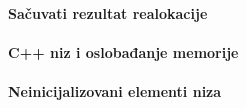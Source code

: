 \paragraph{Sačuvati rezultat realokacije}\label{memcheck-realloc-misc}



\paragraph{C++ niz i oslobađanje memorije}\label{memcheck-cpp-array-misc}



\paragraph{Neinicijalizovani elementi niza}\label{memcheck-uninitialized-array-misc}


